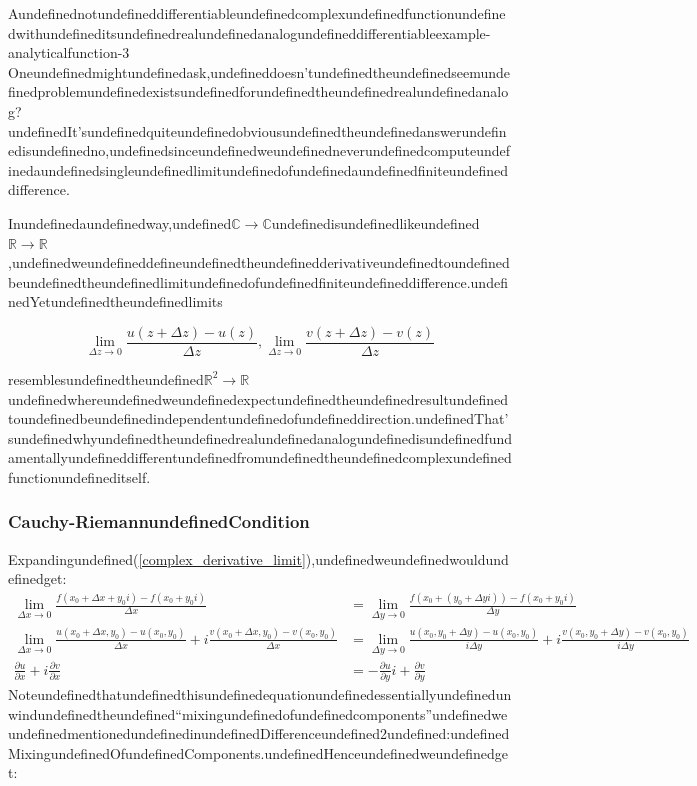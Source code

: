 \begin{mystthmexample}{Aundefinednotundefineddifferentiableundefinedcomplexundefinedfunctionundefinedwithundefineditsundefinedrealundefinedanalogundefineddifferentiable}{example-analyticalfunction-3}
Oneundefinedmightundefinedask,undefineddoesn'tundefinedtheundefinedseemundefinedproblemundefinedexistsundefinedforundefinedtheundefinedrealundefinedanalog?undefinedIt'sundefinedquiteundefinedobviousundefinedtheundefinedanswerundefinedisundefinedno,undefinedsinceundefinedweundefinedneverundefinedcomputeundefinedaundefinedsingleundefinedlimitundefinedofundefinedaundefinedfiniteundefineddifference.

Inundefinedaundefinedway,undefined$\mathbb{C} \to \mathbb{C}$undefinedisundefinedlikeundefined$\mathbb{R}\to \mathbb{R}$,undefinedweundefineddefineundefinedtheundefinedderivativeundefinedtoundefinedbeundefinedtheundefinedlimitundefinedofundefinedfiniteundefineddifference.undefinedYetundefinedtheundefinedlimits

\begin{equation}
\lim_{\Delta z\to 0}\frac{u(z+\Delta z) -u(z)}{\Delta z}, \lim_{\Delta z\to 0}\frac{v(z+\Delta z) -v(z)}{\Delta z}
\end{equation}

resemblesundefinedtheundefined$\mathbb{R}^2 \to \mathbb{R}$undefinedwhereundefinedweundefinedexpectundefinedtheundefinedresultundefinedtoundefinedbeundefinedindependentundefinedofundefineddirection.undefinedThat'sundefinedwhyundefinedtheundefinedrealundefinedanalogundefinedisundefinedfundamentallyundefineddifferentundefinedfromundefinedtheundefinedcomplexundefinedfunctionundefineditself.

\end{mystthmexample}

\subsubsection{Cauchy-RiemannundefinedCondition}

Expandingundefined(\ref{complex_derivative_limit}),undefinedweundefinedwouldundefinedget:
\begin{equation}
\begin{aligned}
\lim_{\Delta x\to 0} \frac{f(x_0+\Delta x + y_0i) - f(x_0+y_0i)}{\Delta x} &= \lim_{\Delta y\to 0} \frac{f(x_0 + (y_0+\Delta yi)) - f(x_0+y_0i)}{\Delta y} \\
\lim_{\Delta x\to 0}\frac{u(x_0+\Delta x, y_0)-u(x_0,y_0)}{\Delta x} + i \frac{v(x_0+\Delta x, y_0)-v(x_0,y_0)}{\Delta x} &=  
\lim_{\Delta y\to 0}\frac{u(x_0, y_0+\Delta y)-u(x_0,y_0)}{i\Delta y} + i \frac{v(x_0, y_0+\Delta y)-v(x_0,y_0)}{i\Delta y}\\
\frac{\partial u}{\partial x}+i\frac{\partial v}{\partial x} &= -\frac{\partial u}{\partial y}i + \frac{\partial v}{\partial y}
\end{aligned}
\end{equation}
Noteundefinedthatundefinedthisundefinedequationundefinedessentiallyundefinedunwindundefinedtheundefined``mixingundefinedofundefinedcomponents''undefinedweundefinedmentionedundefinedinundefinedDifferenceundefined2undefined:undefinedMixingundefinedOfundefinedComponents.undefinedHenceundefinedweundefinedget:

